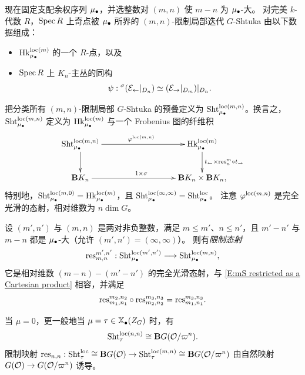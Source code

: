 现在固定支配余权序列 ${\mu_\bullet}$，并选整数对 $(m,n)$ 使 $m-n$ 为 ${\mu_\bullet}$-大。
对完美 $k$-代数 $R$，$\operatorname{Spec} R$ 上奇点被 ${\mu_\bullet}$ 所界的 $(m,n)$-限制局部迭代 $G$-Shtuka 由以下数据组成：
\begin{itemize}
\item $ {\operatorname{Hk}}^{\mathrm{loc}(m)}_{\mu_\bullet}$ 的一个 $R$-点，以及
\item $\operatorname{Spec} R$ 上 $K_n$-主丛的同构
$$\psi:{^\sigma} ({\mathcal E}_\leftarrow|_{D_{n}}) \simeq({\mathcal E}_\to|_{D_{m}})|_{D_{n}}.$$
\end{itemize}
把分类所有 $(m,n)$-限制局部 $G$-Shtuka 的预叠定义为 $\operatorname{Sht}^{\mathrm{loc}(m,n)}_{\mu_\bullet}$。换言之，$\operatorname{Sht}_{\mu_\bullet}^{\mathrm{loc}(m,n)}$ 定义为 ${\operatorname{Hk}}_{\mu_\bullet}^{\mathrm{loc}(m)}$ 与一个 Frobenius 图的纤维积
\begin{equation}
\label{E:mS restricted as a Cartesian product}
\xymatrix@C=90pt{
\Sht_\mmu^{\loc(m,n)} \ar[r]^{\varphi^{\loc(m,n)}} \ar[d]
&  \Hk_\mmu^{\loc(m)} \ar[d]^-{ t_\leftone\times \res^{m}_{n}\circ t_\rightone }
\\ \bfB K_n \ar[r]^{1\times \sigma} & \bfB K_n \times \bfB K_n,
}
\end{equation}
特别地，$\operatorname{Sht}_{\mu_\bullet}^{\mathrm{loc}(m,0)}={\operatorname{Hk}}_{\mu_\bullet}^{\mathrm{loc}(m)}$，且 $\operatorname{Sht}_{\mu_\bullet}^{\mathrm{loc}(\infty,\infty)}=\operatorname{Sht}_{\mu_\bullet}^{\mathrm{loc}}$。
注意 $\varphi^{\mathrm{loc}(m,n)}$ 是完全光滑的态射，相对维数为 $n \dim G$。

设 $(m',n')$ 与 $(m,n)$ 是两对非负整数，满足 $m\leq m'$、$n\leq n'$，且 $m'-n'$ 与 $m-n$ 都是 ${\mu_\bullet}$-大（允许 $(m',n')=(\infty,\infty)$）。
则有\emph{限制态射}
\begin{equation}\label{trunc}
{\operatorname{res}}^{m',n'}_{m,n}: \operatorname{Sht}^{\mathrm{loc}(m',n')}_{\mu_\bullet}\longrightarrow \operatorname{Sht}_{\mu_\bullet}^{\mathrm{loc}(m,n)},
\end{equation}
它是相对维数 $(m-n)-(m'-n')$ 的完全光滑态射，与 \eqref{E:mS restricted as a Cartesian product} 相容，并满足
\begin{equation}
\label{true-to-trun}
{\operatorname{res}}^{m_2,n_2}_{m_1,n_1}\circ{\operatorname{res}}^{m_3,n_3}_{m_2,n_2}={\operatorname{res}}^{m_3,n_3}_{m_1,n_1}.
\end{equation}

\begin{ex}
\label{Ex:mStau mn}
当 $\mu=0$，更一般地当 $\mu=\tau\in\mathbb{X}_\bullet(Z_G)$ 时，有
$$\operatorname{Sht}^{\mathrm{loc}(n,n)}_\tau\cong {\mathbf{B}} G({\mathcal O}/\varpi^n).$$
限制映射 ${\operatorname{res}}_{n,n}: \operatorname{Sht}_\tau^{\mathrm{loc}}\cong{\mathbf{B}} G({\mathcal O})\to \operatorname{Sht}_\tau^{\mathrm{loc}(m,n)}\cong{\mathbf{B}} G({\mathcal O}/\varpi^n)$ 由自然映射 $G({\mathcal O})\to G({\mathcal O}/\varpi^n)$ 诱导。
\end{ex}


